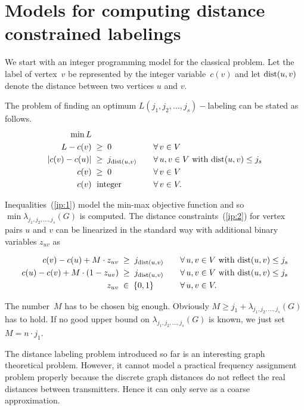 \documentclass[smallextended]{svjour3}
\def\dist{\mathop{\rm dist}}
\begin{document}
\section{Models for computing distance constrained labelings} 
\label{sec:IP} 

We start with an integer programming model for the classical problem. 
Let the label of vertex~$v$ be represented by the integer 
variable~$c(v)$ and let $\dist(u,v)$ denote the distance between two vertices $u$ and $v$. 

The problem of finding an optimum $L(j_1,j_2,\ldots ,j_{s})-$labeling 
can be stated as follows. 
\begin{alignat}{2} 
\min L      &                            & \quad & \notag\\ 
L-c(v)       &\;\ge\;0                    & \quad &\forall\, v\in V\label{ip:1}\\ 
|c(v)-c(u)| &\;\geq\;j_{\dist(u,v)} & & \forall\, u,v\in V\text{ with }{\dist(u,v)}\le j_s \label{ip:2}\\ 
c(v)          &\;\geq\;0                  & &\forall\, v\in V \label{ip:3}\\ 
c(v)          &\;\text{ integer}       & & \forall\, v\in V.\label{ip:4} 
\end{alignat} 

Inequalities~(\ref{ip:1}) model the min-max objective function and so 
$\min\lambda_{j_1,j_2,\ldots ,j_{s}}(G)$ is computed. The distance 
constraints~(\ref{ip:2}) for vertex pairs $u$ and $v$ can be linearized 
in the standard way with additional binary variables $z_{uv}$ as 

\begin{alignat}{2} 
c(v)-c(u)+M\cdot z_{uv}     &\;\geq\;j_{\dist(u,v)} & \quad& \forall\, u,v\in V\text{ with }{\dist(u,v)}\le j_s\notag\\ 
c(u)-c(v)+M\cdot(1-z_{uv}) &\;\geq\;j_{\dist(u,v)} &   &\forall\, u,v\in V\text{ with }{\dist(u,v)}\le j_s\notag\\ 
z_{uv}                                &\;\in\;\{0,1\}              &  & \forall\, u,v\in V.\notag 
\end{alignat} 

The number~$M$ has to be chosen big enough. Obviously 
$M\geq j_1+\lambda_{j_1,j_2,\ldots ,j_{s}}(G)$ has to hold. If no good upper bound 
on $\lambda_{j_1,j_2,\ldots ,j_{s}}(G)$ is known, we just set $M=n\cdot j_1$. 

The distance labeling problem introduced so far is an interesting 
graph theoretical problem. However, it cannot model a practical frequency 
assignment problem properly because the discrete graph distances do not 
reflect the real distances between transmitters. Hence it can only serve 
as a coarse approximation. 
\end{document}
